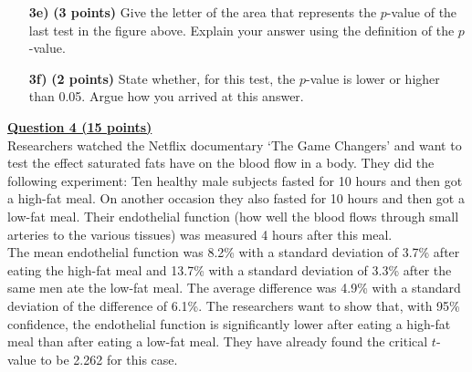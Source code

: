 \begin{itemize}

\item[\textbf{3e)}] \textbf{(3 points)} Give the letter of the area that represents the $p$-value of the last test in the figure above. Explain your answer using the definition of the $p$-value.

\item[\textbf{3f)}] \textbf{(2 points)} State whether, for this test, the $p$-value is lower or higher than 0.05. Argue how you arrived at this answer.
    
\end{itemize}

\clearpage %

\underline{\textbf{Question 4 (15 points)}} \\

Researchers watched the Netflix documentary ‘The Game Changers’ and want to test the effect saturated fats have on the blood flow in a body. They did the following experiment: Ten healthy male subjects fasted for 10 hours and then got a high-fat meal. On another occasion they also fasted for 10 hours and then got a low-fat meal. Their endothelial function (how well the blood flows through small arteries to the various tissues) was measured 4 hours after this meal. \\

The mean endothelial function was 8.2\% with a standard deviation of 3.7\% after eating the high-fat meal and 13.7\% with a standard deviation of 3.3\% after the same men ate the low-fat meal. The average difference was 4.9\% with a standard deviation of the difference of 6.1\%. The researchers want to show that, with 95\% confidence, the endothelial function is significantly lower after eating a high-fat meal than after eating a low-fat meal. They have already found the critical $t$-value to be 2.262 for this case.

